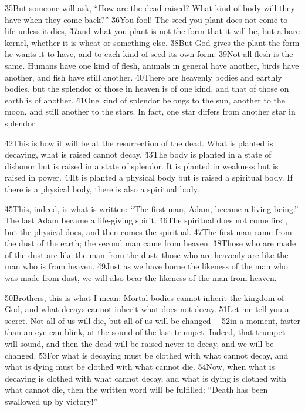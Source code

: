 \v{35}But someone will ask, ``How are the dead raised? What kind of body will they have when they come back?'' \v{36}You fool! The seed you plant does not come to life unless it dies, \v{37}and what you plant is not the form that it will be, but a bare kernel, whether it is wheat or something else. \v{38}But God gives the plant the form he wants it to have, and to each kind of seed its own form. \v{39}Not all flesh is the same. Humans have one kind of flesh, animals in general have another, birds have another, and fish have still another. \v{40}There are heavenly bodies and earthly bodies, but the splendor of those in heaven is of one kind, and that of those on earth is of another. \v{41}One kind of splendor belongs to the sun, another to the moon, and still another to the stars. In fact, one star differs from another star in splendor.

\v{42}This is how it will be at the resurrection of the dead. What is planted is decaying, what is raised cannot decay. \v{43}The body is planted in a state of dishonor but is raised in a state of splendor. It is planted in weakness but is raised in power. \v{44}It is planted a physical body but is raised a spiritual body. If there is a physical body, there is also a spiritual body.

\v{45}This, indeed, is what is written: ``The first man, Adam, became a living being.'' The last Adam became a life-giving spirit. \v{46}The spiritual does not come first, but the physical does, and then comes the spiritual. \v{47}The first man came from the dust of the earth; the second man came from heaven. \v{48}Those who are made of the dust are like the man from the dust; those who are heavenly are like the man who is from heaven. \v{49}Just as we have borne the likeness of the man who was made from dust, we will also bear the likeness of the man from heaven.

\v{50}Brothers, this is what I mean: Mortal bodies cannot inherit the kingdom of God, and what decays cannot inherit what does not decay. \v{51}Let me tell you a secret. Not all of us will die, but all of us will be changed--- \v{52}in a moment, faster than an eye can blink, at the sound of the last trumpet. Indeed, that trumpet will sound, and then the dead will be raised never to decay, and we will be changed. \v{53}For what is decaying must be clothed with what cannot decay, and what is dying must be clothed with what cannot die. \v{54}Now, when what is decaying is clothed with what cannot decay, and what is dying is clothed with what cannot die, then the written word will be fulfilled: ``Death has been swallowed up by victory!''


